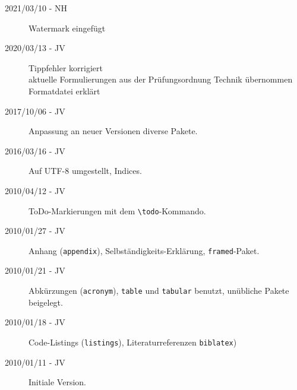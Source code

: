 \begin{description}
	\item[2021/03/10 - NH] Watermark eingefügt
	\item[2020/03/13 - JV] Tippfehler korrigiert\\
	                  aktuelle Formulierungen aus der Prüfungsordnung Technik übernommen\\
	                  Formatdatei erklärt
	\item[2017/10/06 - JV] Anpassung an neuer Versionen diverse Pakete.
	\item[2016/03/16 - JV] Auf UTF-8 umgestellt, Indices.
	\item[2010/04/12 - JV] ToDo-Markierungen mit dem \verb+\todo+-Kommando.
	\item[2010/01/27 - JV] Anhang (\texttt{appendix}), Selbständigkeits-Erklärung, \texttt{framed}-Paket.
	\item[2010/01/21 - JV] Abkürzungen (\texttt{acronym}), \texttt{table} und \texttt{tabular} benutzt,
	     unübliche Pakete beigelegt.
	\item[2010/01/18 - JV] Code-Listings (\texttt{listings}), Literaturreferenzen \texttt{biblatex})
	\item[2010/01/11 - JV] Initiale Version.
\end{description}
